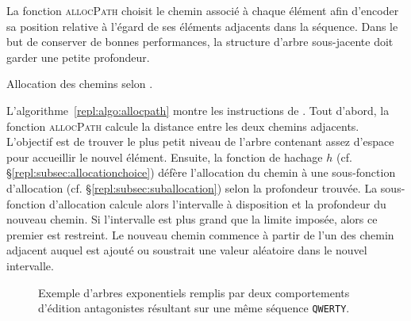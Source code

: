 La fonction \textsc{allocPath} choisit le chemin associé à chaque élément afin
d'encoder sa position relative à l'égard de ses éléments adjacents dans la
séquence. Dans le but de conserver de bonnes performances, la structure d'arbre
sous-jacente doit garder une petite profondeur.

\begin{algorithm}
  
  \caption[Allocation des chemins selon \LSEQ]
  {\label{repl:algo:allocpath}Allocation des chemins selon \LSEQ.}
\end{algorithm}

L'algorithme~\ref{repl:algo:allocpath} montre les instructions de \LSEQ. Tout
d'abord, la fonction \textsc{allocPath} calcule la distance entre les deux
chemins adjacents. L'objectif est de trouver le plus petit niveau de l'arbre
contenant assez d'espace pour accueillir le nouvel élément.
Ensuite, la fonction de hachage $h$ (cf. §\ref{repl:subsec:allocationchoice})
défère l'allocation du chemin à une sous-fonction d'allocation
(cf. §\ref{repl:subsec:suballocation}) selon la profondeur trouvée. 
La sous-fonction d'allocation calcule alors l'intervalle à disposition et la
profondeur du nouveau chemin. Si l'intervalle est plus grand que la limite
imposée, alors ce premier est restreint. Le nouveau chemin commence à partir de
l'un des chemin adjacent auquel est ajouté ou soustrait une valeur aléatoire
dans le nouvel intervalle.

\begin{figure}
  \begin{center}
    \caption[Gestion des comportements d'édition par \LSEQ]
    {\label{repl:fig:lseqtreeexample} Exemple d'arbres exponentiels \LSEQ
      remplis par deux comportements d'édition antagonistes résultant sur une
      même séquence \texttt{QWERTY}.}
  \end{center}
\end{figure}

